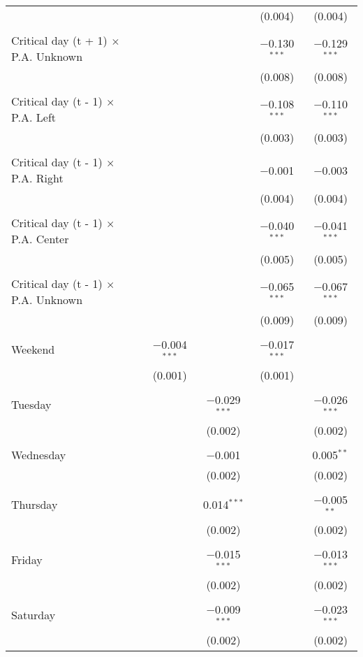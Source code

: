 \documentclass[
]{article}
\begin{document}
\begin{table}[!htbp]
{\begin{tabular}{@{\extracolsep{5pt}}lcccc}
  &  &  & (0.004) & (0.004) \\ 
  & & & & \\ 
 Critical day (t + 1) $\times$ P.A. Unknown &  &  & $-$0.130$^{***}$ & $-$0.129$^{***}$ \\ 
  &  &  & (0.008) & (0.008) \\ 
  & & & & \\ 
 Critical day (t - 1) $\times$ P.A. Left &  &  & $-$0.108$^{***}$ & $-$0.110$^{***}$ \\ 
  &  &  & (0.003) & (0.003) \\ 
  & & & & \\ 
 Critical day (t - 1) $\times$ P.A. Right &  &  & $-$0.001 & $-$0.003 \\ 
  &  &  & (0.004) & (0.004) \\ 
  & & & & \\ 
 Critical day (t - 1) $\times$ P.A. Center &  &  & $-$0.040$^{***}$ & $-$0.041$^{***}$ \\ 
  &  &  & (0.005) & (0.005) \\ 
  & & & & \\ 
 Critical day (t - 1) $\times$ P.A. Unknown &  &  & $-$0.065$^{***}$ & $-$0.067$^{***}$ \\ 
  &  &  & (0.009) & (0.009) \\ 
  & & & & \\ 
 Weekend & $-$0.004$^{***}$ &  & $-$0.017$^{***}$ &  \\ 
  & (0.001) &  & (0.001) &  \\ 
  & & & & \\ 
 Tuesday &  & $-$0.029$^{***}$ &  & $-$0.026$^{***}$ \\ 
  &  & (0.002) &  & (0.002) \\ 
  & & & & \\ 
 Wednesday &  & $-$0.001 &  & 0.005$^{**}$ \\ 
  &  & (0.002) &  & (0.002) \\ 
  & & & & \\ 
 Thursday &  & 0.014$^{***}$ &  & $-$0.005$^{**}$ \\ 
  &  & (0.002) &  & (0.002) \\ 
  & & & & \\ 
 Friday &  & $-$0.015$^{***}$ &  & $-$0.013$^{***}$ \\ 
  &  & (0.002) &  & (0.002) \\ 
  & & & & \\ 
 Saturday &  & $-$0.009$^{***}$ &  & $-$0.023$^{***}$ \\ 
  &  & (0.002) &  & (0.002) \\ 

\end{tabular}}
\end{table}
\end{document}
